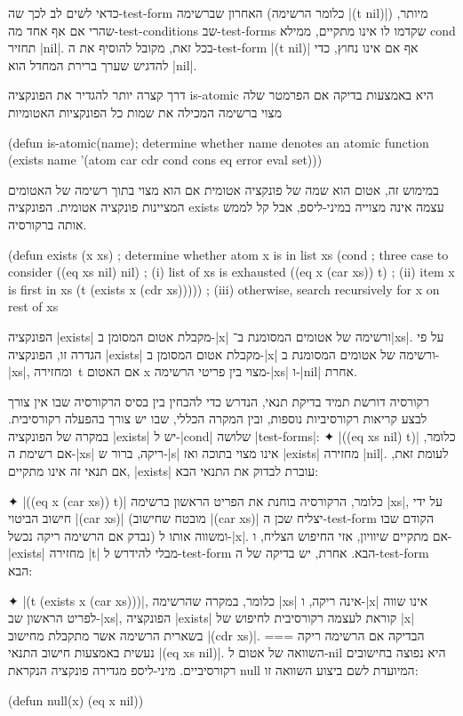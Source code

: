 כדאי לשים לב לכך שה-test-form האחרון שברשימה (כלומר הרשימה \T|(t nil)|) מיותר,
שהרי אם אף אחד מה-test-conditions שב-test-forms שקדמו לו אינו מתקיים, ממילא
cond תחזיר \E|nil|. בכל זאת, מקובל להוסיף את ה-test-form \T|(t nil)| אף אם אינו
נחוץ, כדי להדגיש שערך ברירת המחדל הוא \E|nil|.

דרך קצרה יותר להגדיר את הפונקציה is-atomic היא באמצעות בדיקה אם הפרמטר
שלה מצוי ברשימה המכילה את שמות כל הפונקציות האטומיות
\begin{KERNEL}
(defun is-atomic(name); determine whether name denotes an atomic function
  (exists name '(atom car cdr cond cons eq error eval set)))
\end{KERNEL}
במימוש זה, אטום הוא שמה של פונקציה אטומית אם הוא מצוי בתוך רשימה של האטומים
המציינות פונקציה אטומית. הפונקציה exists עצמה אינה מצוייה במיני-ליספ, אבל
קל לממש אותה ברקורסיה.
\begin{LISP}
(defun exists (x xs) ; determine whether atom x is in list xs
  (cond ; three case to consider
    ((eq xs nil) nil) ; (i) list of xs is exhausted
    ((eq x (car xs)) t) ; (ii) item x is first in xs
    (t (exists x (cdr xs))))) ; (iii) otherwise, search recursively for x on rest of xs
\end{LISP}
הפונקציה \T|exists| מקבלת אטום המסומן ב-\T|x| ורשימה של אטומים המסומנת ב־\T|xs|. 
על פי הגדרה זו, הפונקציה \T|exists| מקבלת אטום המסומן ב-\T|x| ורשימה של אטומים
המסומנת ב-\T|xs|, ומחזירה~t אם האטום x מצוי בין פריטי הרשימה-\T|xs| ו-\T|nil|
אחרת.

רקורסיה דורשת תמיד בדיקת תנאי, הנדרש כדי להבחין בין בסיס הרקורסיה שבו אין צורך
לבצע קריאות רקורסיביות נוספות, ובין המקרה הכללי, שבו יש צורך בהפעלה רקורסיבית.
במקרה של הפונקציה \T|exists| יש ל-\T|cond| שלושה \E|test-forms|:
✦ \T|((eq xs nil) t)| כלומר, אם רשימת ה-\T|xs| ריקה, ברור ש-\T|s| אינו מצוי
בתוכה ואז \T|exists| מחזירה \T|nil|. לעומת זאת, אם תנאי זה אינו מתקיים,
\T|exists| עוברת לבדוק את התנאי הבא:

✦ \T|((eq x (car xs)) t)| כלומר, הרקורסיה בוחנת את הפריט הראשון ברשימה \T|xs|,
על ידי חישוב הביטוי \T|(car xs)| (מובטח שחישוב \T|(car xs)| יצליח שכן
ה-test-form הקודם שבו נבדק אם הרשימה ריקה נכשל) ומשווה אותו ל-\T|x|. אם מתקיים
שיוויון, אזי החיפוש הצליח, ו-\T|exists| מחזירה \T|t| מבלי להידרש ל-test-form
הבא. אחרת, יש בדיקה של ה-test-form הבא:

✦ \T|(t (exists x (car xs)))|, כלומר, במקרה שהרשימה \T|xs| אינה ריקה, ו-\T|x|
אינו שווה לפריט הראשון שב-\T|xs|, הפונקציה \T|exists| קוראת לעצמה רקורסיבית
לחיפוש של \T|x| בשארית הרשימה אשר מתקבלת מחישוב \T|(cdr xs)|.
===
הבדיקה אם הרשימה ריקה נעשית באמצעות חישוב התנאי \T|(eq xs nil)|. השוואה של
אטום ל-nil היא נפוצה בחישובים רקורסיביים. מיני-ליספ מגדירה פונקציה הנקראת null
המיועדת לשם ביצוע השוואה זו:
\begin{LIBRARY}
(defun null(x) (eq x nil))
\end{LIBRARY}

